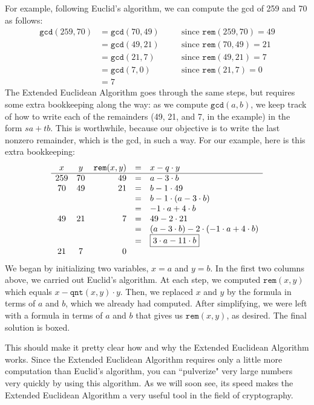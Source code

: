 \documentclass[11pt,oneside]{book}
\theoremstyle{definition}
\begin{document}
For example, following Euclid's algorithm, we can compute the gcd of 259 and 70 as follows:
\[\begin{array}{rlcl}
    \texttt{gcd}(259, 70) &= \texttt{gcd}(70, 49) & \quad & \text{since } \texttt{rem}(259, 70) = 49 \\
    &= \texttt{gcd}(49, 21) && \text{since } \texttt{rem}(70, 49) = 21 \\
    &= \texttt{gcd}(21, 7) && \text{since } \texttt{rem}(49, 21) = 7 \\
    &= \texttt{gcd}(7, 0) && \text{since } \texttt{rem}(21, 7) = 0 \\
    &= 7 &&
\end{array}\]
The Extended Euclidean Algorithm goes through the same steps, but requires some extra bookkeeping along the way: as we compute $\texttt{gcd}(a, b)$, we keep track of how to write each of the remainders (49, 21, and 7, in the example) in the form $sa + tb$.
This is worthwhile, because our objective is to write the last nonzero remainder, which is the gcd, in such a way.
For our example, here is this extra bookkeeping:
\[\begin{array}{ccrcl}
    x & y & \texttt{rem}(x, y) &=& x - q \cdot y \\
    \hline
    259 & 70 & 49 &=& a - 3 \cdot b \\
    70 & 49 & 21 &=& b - 1 \cdot 49 \\
    &&&=& b - 1 \cdot (a - 3 \cdot b) \\
    &&&=& -1 \cdot a + 4 \cdot b \\
    49 & 21 & 7 &=& 49 - 2 \cdot 21 \\
    &&&=& (a - 3 \cdot b) - 2 \cdot (-1 \cdot a + 4 \cdot b) \\
    &&&=& \fbox{$3 \cdot a - 11 \cdot b$} \\
    21 & 7 & 0 &&
\end{array}\]
We began by initializing two variables, $x = a$ and $y = b$.
In the first two columns above, we carried out Euclid's algorithm.
At each step, we computed $\texttt{rem}(x, y)$ which equals $x - \texttt{qnt}(x, y) \cdot y$.
Then, we replaced $x$ and $y$ by the formula in terms of $a$ and $b$, which we already had computed.
After simplifying, we were left with a formula in terms of $a$ and $b$ that gives us $\texttt{rem}(x, y)$, as desired.
The final solution is boxed.

This should make it pretty clear how and why the Extended Euclidean Algorithm works.
Since the Extended Euclidean Algorithm requires only a little more computation than Euclid's algorithm, you can ``pulverize" very large numbers very quickly by using this algorithm.
As we will soon see, its speed makes the Extended Euclidean Algorithm a very useful tool in the field of cryptography.
\end{document}
